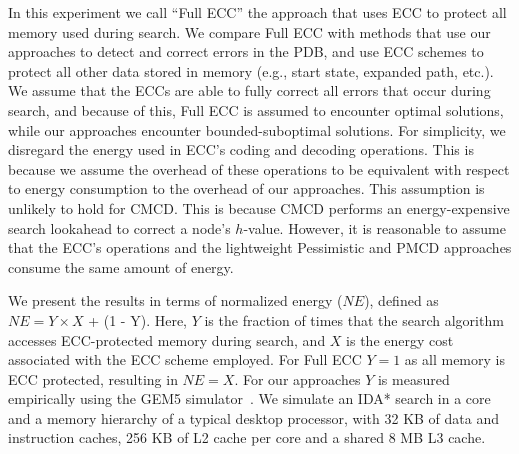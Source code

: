 \documentclass{article}
\begin{document}
In this experiment we call ``Full ECC'' the approach that uses ECC to protect all memory used during search. We compare Full ECC with methods that use our approaches to detect and correct errors in the PDB, and use ECC schemes to protect all other data stored in memory (e.g., start state, expanded path, etc.). We assume that the ECCs are able to fully correct all errors that occur during search, and because of this, Full ECC is assumed to encounter optimal solutions, while our approaches encounter bounded-suboptimal solutions. For simplicity, we disregard the energy used in ECC's coding and decoding operations. This is because we assume the overhead of these operations to be equivalent with respect to energy consumption to the overhead of our approaches. This assumption is unlikely to hold for CMCD. This is because CMCD performs an energy-expensive search lookahead to correct a node's $h$-value. However, it is reasonable to assume that the ECC's operations and the lightweight Pessimistic and PMCD approaches consume the same amount of energy. 



We present the results in terms of normalized energy ($NE$), defined as $NE = Y \times X$ + (1 - Y). Here, $Y$ is the fraction of times that the search algorithm accesses ECC-protected memory during search, and $X$ is the energy cost associated with the ECC scheme employed. For Full ECC $Y = 1$ as all memory is ECC protected, resulting in $NE = X$. For our approaches $Y$ is measured empirically using the GEM5 simulator~\cite{Binkert2011}. We simulate an IDA* search in a core and a memory hierarchy of a typical desktop processor, with 32 KB of data and instruction caches, 256 KB of L2 cache per core and a shared 8 MB L3 cache. 


\end{document}
